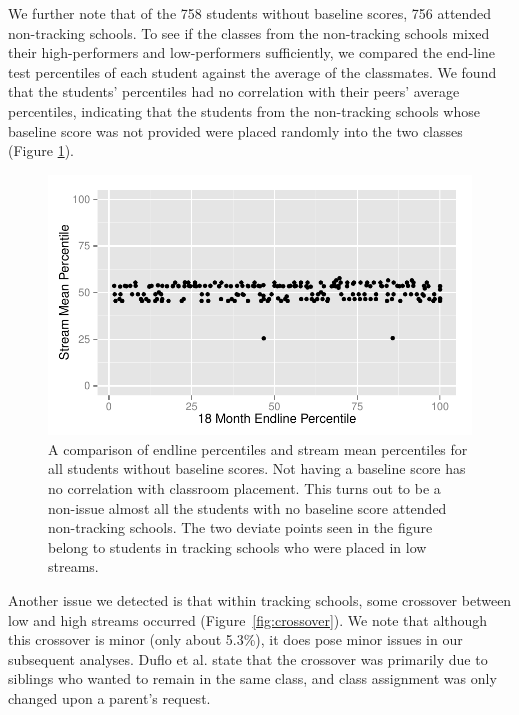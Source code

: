 \documentclass[11pt]{article}
\begin{document}
We further note that of the 758 students without baseline scores, 756 attended non-tracking schools.  To see if the classes from the non-tracking schools mixed their high-performers and low-performers sufficiently, we compared the end-line test percentiles of each student against the average of the classmates. We found that the students' percentiles had no correlation with their peers' average percentiles, indicating that the students from the non-tracking schools whose baseline score was not provided were placed randomly into the two classes (Figure \ref{fig:NoBaselinePercentile}).

  \begin{figure}[H]
  	\centering
  	\includegraphics[scale=0.8]{../Figures/NoBaselinePercentile.pdf}
  	\caption{A comparison of endline percentiles and stream mean percentiles for all students without baseline scores.  Not having a baseline score has no correlation with classroom placement.  This turns out to be a non-issue almost all the students with no baseline score attended non-tracking schools.  The two deviate points seen in the figure belong to students in tracking schools who were placed in low streams.}
  	\label{fig:NoBaselinePercentile}
  \end{figure} 

Another issue we detected is that within tracking schools, some crossover between low and high streams occurred (Figure~\ref{fig:crossover}). We note that although this crossover is minor (only about 5.3\%), it does pose minor issues in our subsequent analyses. Duflo et al. state that the crossover was primarily due to siblings who wanted to remain in the same class, and class assignment was only changed upon a parent's request.

 
 
\end{document}
